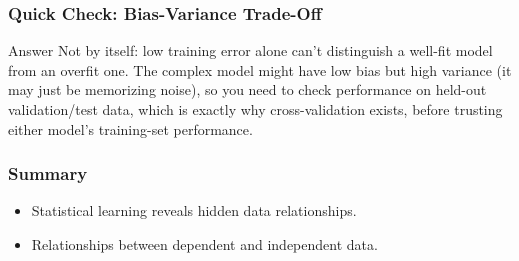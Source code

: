 \begin{frame}[fragile]\frametitle{Quick Check: Bias-Variance Trade-Off}
\begin{block}{Answer}
Not by itself: low training error alone can't distinguish a well-fit model from an overfit one. The complex model might have low bias but high variance (it may just be memorizing noise), so you need to check performance on held-out validation/test data, which is exactly why cross-validation exists, before trusting either model's training-set performance.
\end{block}
\end{frame}

\begin{frame}[fragile]\frametitle{Summary}
\begin{itemize}
\item Statistical learning reveals hidden data relationships.
\item Relationships between  dependent and  independent data.
\end{itemize}
\end{frame}



